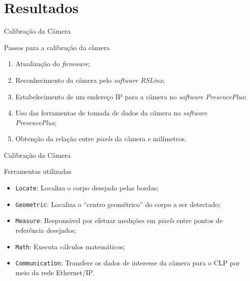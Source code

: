 \documentclass[10pt]{beamer}
\begin{document}
\section{Resultados}

\begin{frame}[fragile]{Calibração da Câmera}
\begin{block}{Passos para a calibração da câmera}
\begin{enumerate}
	\item Atualização do \textit{firmware};
	\item Reconhecimento da câmera pelo \textit{software RSLinx};
	\item Estabelecimento de um endereço IP para a câmera no \textit{software PresencePlus};
	\item Uso das ferramentas de tomada de dados da câmera no \textit{software PresencePlus};
	\item Obtenção da relação entre \textit{pixels} da câmera e milímetros.
\end{enumerate}
\end{block}
\end{frame}

\begin{frame}[fragile]{Calibração da Câmera}
\begin{block}{Ferramentas utilizadas}
\begin{itemize}
	\item \texttt{Locate}: Localiza o corpo desejado pelas bordas;
	\item \texttt{Geometric}: Localiza o ``centro geométrico'' do corpo a ser detectado;
	\item \texttt{Measure}: Responsável por efetuar medições em \textit{pixels} entre pontos de referência desejados;
	\item \texttt{Math}: Executa cálculos matemáticos;
	\item \texttt{Communication}: Transfere os dados de interesse da câmera para o CLP por meio da rede Ethernet/IP.
\end{itemize}
\end{block}
\end{frame}
\end{document}
